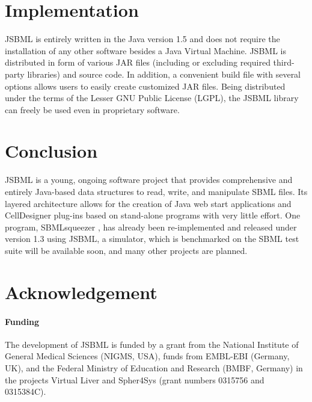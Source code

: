 \documentclass{bioinfo}
\begin{document}
\section{Implementation}

JSBML is entirely written in the Java\texttrademark{} version 1.5 and does 
not require the installation of any other software besides a Java Virtual
Machine.
JSBML is distributed in form of various JAR files (including or excluding
required third-party libraries) and source code. In addition, a convenient build
file with several options allows users to easily create customized JAR files.
Being distributed under the terms of the Lesser GNU Public License (LGPL), the
JSBML library can freely be used even in proprietary software.



\section{Conclusion}

JSBML is a young, ongoing software project that
provides comprehensive and entirely Java-based data structures
to read, write, and manipulate SBML files. Its layered architecture
allows for the creation of Java web start applications and
CellDesigner plug-ins based on stand-alone programs with very
little effort.
%
One program, SBMLsqueezer \citep{Draeger2008}, has already been
re-implemented and released under version 1.3 using JSBML, a simulator, which is
benchmarked on the SBML test suite will be available soon, and
many other projects are planned.

\section*{Acknowledgement}

\paragraph{Funding\textcolon}
The development of JSBML is funded by a grant from the National Institute
of General Medical Sciences (NIGMS, USA), funds from EMBL-EBI (Germany, UK),
and the Federal Ministry of Education and Research (BMBF, Germany) in the
projects Virtual Liver and Spher4Sys (grant numbers 0315756 and 0315384C).
\end{document}
